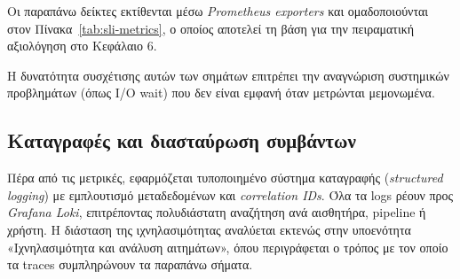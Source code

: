 Οι παραπάνω δείκτες εκτίθενται μέσω \textit{Prometheus exporters} και
ομαδοποιούνται στον Πίνακα~\ref{tab:sli-metrics}, ο οποίος αποτελεί τη βάση για
την πειραματική αξιολόγηση στο Κεφάλαιο 6.

\begin{table}[H]
	\centering
	\small
	\renewcommand{\arraystretch}{1.5}

	\caption{Συγκεντρωτικός πίνακας SLI και αντίστοιχων μετρικών Prometheus}
	\label{tab:sli-metrics}
\end{table}

Η δυνατότητα συσχέτισης αυτών των σημάτων επιτρέπει την αναγνώριση συστημικών
προβλημάτων (όπως I/O wait) που δεν είναι εμφανή όταν μετρώνται μεμονωμένα.

\subsection{Καταγραφές και διασταύρωση συμβάντων}

Πέρα από τις μετρικές, εφαρμόζεται τυποποιημένο σύστημα καταγραφής
(\textit{structured logging}) με εμπλουτισμό μεταδεδομένων και
\textit{correlation IDs}. Όλα τα logs ρέουν προς \textit{Grafana Loki},
επιτρέποντας πολυδιάστατη αναζήτηση ανά αισθητήρα, pipeline ή χρήστη. Η
διάσταση της ιχνηλασιμότητας αναλύεται εκτενώς στην υποενότητα «Ιχνηλασιμότητα
και ανάλυση αιτημάτων», όπου περιγράφεται ο τρόπος με τον οποίο τα traces
συμπληρώνουν τα παραπάνω σήματα.

